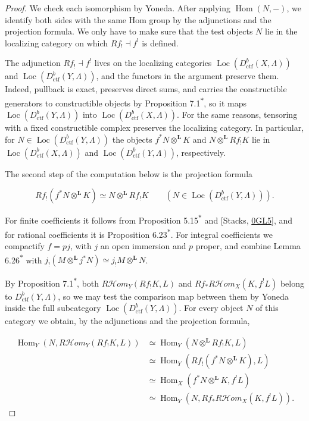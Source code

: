 \documentclass[11pt]{article}
\newcommand{\bpout}[1]{#1\textsuperscript{\hyperlink{bp-outside}{\ensuremath{\ast}}}}
\providecommand{\Hom}{}\renewcommand{\Hom}{\operatorname{Hom}}
\providecommand{\Loc}{}\renewcommand{\Loc}{\operatorname{Loc}}
\providecommand{\cHom}{}\renewcommand{\cHom}{R\mathcal{H}\!om}
\begin{document}
\begin{proof}[{Proof}]\label{bp111}%
We check each isomorphism by Yoneda. After applying \(\Hom(N,-)\), we identify both sides with the same Hom group by the adjunctions and the projection formula. We only have to make sure that the test objects \(N\) lie in the localizing category on which \(Rf_!\dashv f^!\) is defined.

The adjunction \(Rf_!\dashv f^!\) lives on the localizing categories \(\Loc(D^b_{\mathrm{ctf}}(X,\Lambda))\) and \(\Loc(D^b_{\mathrm{ctf}}(Y,\Lambda))\), and the functors in the argument preserve them. Indeed, pullback is exact, preserves direct sums, and carries the constructible generators to constructible objects by Proposition \bpout{7.1}, so it maps \(\Loc(D^b_{\mathrm{ctf}}(Y,\Lambda))\) into \(\Loc(D^b_{\mathrm{ctf}}(X,\Lambda))\). For the same reasons, tensoring with a fixed constructible complex preserves the localizing category. In particular, for \(N\in\Loc(D^b_{\mathrm{ctf}}(Y,\Lambda))\) the objects \(f^*N\otimes^{\mathbf L}K\) and \(N\otimes^{\mathbf L}Rf_!K\) lie in \(\Loc(D^b_{\mathrm{ctf}}(X,\Lambda))\) and \(\Loc(D^b_{\mathrm{ctf}}(Y,\Lambda))\), respectively.

The second step of the computation below is the projection formula

\[
Rf_!(f^*N\otimes^{\mathbf L}K)\simeq N\otimes^{\mathbf L}Rf_!K
\qquad(N\in\Loc(D^b_{\mathrm{ctf}}(Y,\Lambda))).
\]

For finite coefficients it follows from Proposition \bpout{5.15} and [Stacks, \href{https://stacks.math.columbia.edu/tag/0GL5}{0GL5}], and for rational coefficients it is Proposition \bpout{6.23}. For integral coefficients we compactify \(f=pj\), with \(j\) an open immersion and \(p\) proper, and combine Lemma \bpout{6.26} with \(j_!(M\otimes^{\mathbf L}j^*N)
 \simeq j_!M\otimes^{\mathbf L}N\).

By Proposition \bpout{7.1}, both \(\cHom_Y(Rf_!K,L)\) and \(Rf_*\cHom_X(K,f^!L)\) belong to \(D^b_{\mathrm{ctf}}(Y,\Lambda)\), so we may test the comparison map between them by Yoneda inside the full subcategory \(\Loc(D^b_{\mathrm{ctf}}(Y,\Lambda))\). For every object \(N\) of this category we obtain, by the adjunctions and the projection formula,

\[
\begin{aligned}
\Hom_Y(N,\cHom_Y(Rf_!K,L))
&\simeq\Hom_Y(N\otimes^{\mathbf L}Rf_!K,L)\\
&\simeq\Hom_Y(Rf_!(f^*N\otimes^{\mathbf L}K),L)\\
&\simeq\Hom_X(f^*N\otimes^{\mathbf L}K,f^!L)\\
&\simeq\Hom_Y(N,Rf_*\cHom_X(K,f^!L)).
\end{aligned}
\]


\end{proof}
\end{document}
